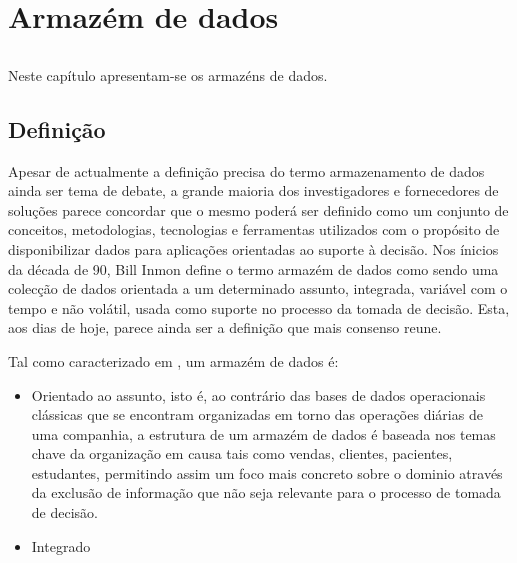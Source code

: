 \chapter{Armazém de dados}
\label{chap:data_warehouse}

\section*{}

Neste capítulo apresentam-se os armazéns de dados.

\section{Definição}
\label{section:definition}

Apesar de actualmente a definição precisa do termo armazenamento de dados ainda
ser tema de debate, a grande maioria dos investigadores e fornecedores de soluções
parece concordar que o mesmo poderá ser definido como um conjunto de conceitos,
metodologias, tecnologias e ferramentas utilizados com o propósito de disponibilizar
dados para aplicações orientadas ao suporte à decisão. Nos ínicios da década de
90, Bill Inmon \citet{Inmon92} define o termo armazém de dados como sendo uma
colecção de dados orientada a um determinado assunto, integrada, variável com o
tempo e não volátil, usada como suporte no processo da tomada de decisão. Esta,
aos dias de hoje, parece ainda ser a definição que mais consenso reune.

Tal como caracterizado em \citet{Inmon92}, um armazém de dados é:
\begin{itemize}
    \item Orientado ao assunto, isto é, ao contrário das bases de dados
    operacionais clássicas que se encontram organizadas em torno das operações
    diárias de uma companhia, a estrutura de um armazém de dados é baseada nos
    temas chave da organização em causa tais como vendas, clientes, pacientes,
    estudantes, permitindo assim um foco mais concreto sobre o dominio através
    da exclusão de informação que não seja relevante para o processo de tomada
    de decisão.
    \item Integrado
\end{itemize}


